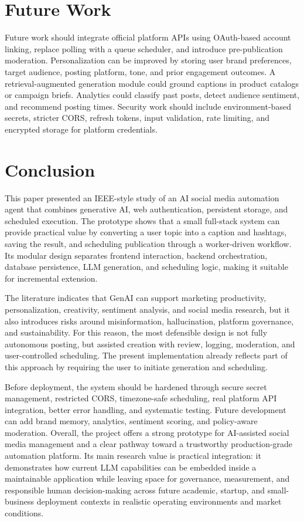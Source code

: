 \documentclass[conference]{IEEEtran}
\begin{document}
\section{Future Work}

Future work should integrate official platform APIs using OAuth-based account linking, replace polling with a queue scheduler, and introduce pre-publication moderation. Personalization can be improved by storing user brand preferences, target audience, posting platform, tone, and prior engagement outcomes. A retrieval-augmented generation module could ground captions in product catalogs or campaign briefs. Analytics could classify past posts, detect audience sentiment, and recommend posting times. Security work should include environment-based secrets, stricter CORS, refresh tokens, input validation, rate limiting, and encrypted storage for platform credentials.

\section{Conclusion}

This paper presented an IEEE-style study of an AI social media automation agent that combines generative AI, web authentication, persistent storage, and scheduled execution. The prototype shows that a small full-stack system can provide practical value by converting a user topic into a caption and hashtags, saving the result, and scheduling publication through a worker-driven workflow. Its modular design separates frontend interaction, backend orchestration, database persistence, LLM generation, and scheduling logic, making it suitable for incremental extension.

The literature indicates that GenAI can support marketing productivity, personalization, creativity, sentiment analysis, and social media research, but it also introduces risks around misinformation, hallucination, platform governance, and sustainability. For this reason, the most defensible design is not fully autonomous posting, but assisted creation with review, logging, moderation, and user-controlled scheduling. The present implementation already reflects part of this approach by requiring the user to initiate generation and scheduling.

Before deployment, the system should be hardened through secure secret management, restricted CORS, timezone-safe scheduling, real platform API integration, better error handling, and systematic testing. Future development can add brand memory, analytics, sentiment scoring, and policy-aware moderation. Overall, the project offers a strong prototype for AI-assisted social media management and a clear pathway toward a trustworthy production-grade automation platform. Its main research value is practical integration: it demonstrates how current LLM capabilities can be embedded inside a maintainable application while leaving space for governance, measurement, and responsible human decision-making across future academic, startup, and small-business deployment contexts in realistic operating environments and market conditions.
\end{document}

